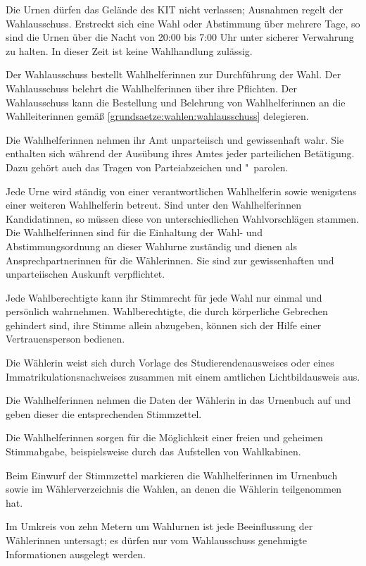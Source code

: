 Die Urnen dürfen das Gelände des KIT nicht verlassen; Ausnahmen regelt der Wahlausschuss. Erstreckt sich eine Wahl oder Abstimmung über mehrere Tage, so sind die Urnen über die Nacht von 20:00 bis 7:00 Uhr unter sicherer Verwahrung zu halten. In dieser Zeit ist keine Wahlhandlung zulässig.

\label{wahl:wahlhelferinnen}
Der Wahlausschuss bestellt Wahlhelferinnen zur Durchführung der Wahl. Der Wahlausschuss belehrt die Wahlhelferinnen über ihre Pflichten. Der Wahlausschuss kann die Bestellung und Belehrung von Wahlhelferinnen an die Wahlleiterinnen gemäß \ref{grundsaetze:wahlen:wahlausschuss} delegieren.

Die Wahlhelferinnen nehmen ihr Amt unparteiisch und gewissenhaft wahr. Sie enthalten sich während der Ausübung ihres Amtes jeder parteilichen Betätigung. Dazu gehört auch das Tragen von Parteiabzeichen und "~parolen.

\label{wahl:wahlhandlung}
Jede Urne wird ständig von einer verantwortlichen Wahlhelferin sowie wenigstens einer weiteren Wahlhelferin betreut. Sind unter den Wahlhelferinnen Kandidatinnen, so müssen diese von unterschiedlichen Wahlvorschlägen stammen. Die Wahlhelferinnen sind für die Einhaltung der Wahl- und Abstimmungsordnung an dieser Wahlurne zuständig und dienen als Ansprechpartnerinnen für die Wählerinnen. Sie sind zur gewissenhaften und unparteiischen Auskunft verpflichtet.

Jede Wahlberechtigte kann ihr Stimmrecht für jede Wahl nur einmal und persönlich wahrnehmen. Wahlberechtigte, die durch körperliche Gebrechen gehindert sind, ihre Stimme allein abzugeben, können sich der Hilfe einer Vertrauensperson bedienen.

Die Wählerin weist sich durch Vorlage des Studierendenausweises oder  eines Immatrikulationsnachweises zusammen mit einem amtlichen Lichtbildausweis aus. \label{wahl:wahlhandlung:nachweis}

Die Wahlhelferinnen nehmen die Daten der Wählerin in das Urnenbuch auf und geben dieser die entsprechenden Stimmzettel.

Die Wahlhelferinnen sorgen für die Möglichkeit einer freien und geheimen Stimmabgabe, beispielsweise durch das Aufstellen von Wahlkabinen.

Beim Einwurf der Stimmzettel markieren die Wahlhelferinnen im Urnenbuch sowie im Wählerverzeichnis die Wahlen, an denen die Wählerin teilgenommen hat.

Im Umkreis von zehn Metern um Wahlurnen ist jede Beeinflussung der Wählerinnen untersagt; es dürfen nur vom Wahlausschuss genehmigte Informationen ausgelegt werden.

